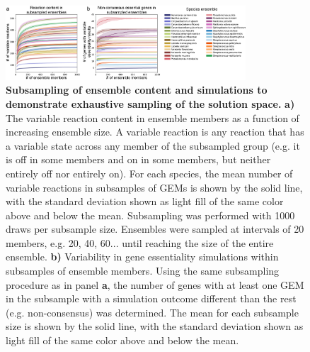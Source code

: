\documentclass[11pt,twocolumn,notitlepage,openany,twoside]{book}
\begin{document}
\begin{refsection}
\begin{figure}[tb]
\centering
\includegraphics[width=0.8\textwidth]{ch3_fig2}
\caption[ Subsampling of ensemble content and simulations to demonstrate exhaustive sampling of the solution space.]{\textbf{ Subsampling of ensemble content and simulations to demonstrate exhaustive sampling of the solution space.} \textbf{a)} The variable reaction content in ensemble members as a function of increasing ensemble size. A variable reaction is any reaction that has a variable state across any member of the subsampled group (e.g. it is off in some members and on in some members, but neither entirely off nor entirely on). For each species, the mean number of variable reactions in subsamples of GEMs is shown by the solid line, with the standard deviation shown as light fill of the same color above and below the mean. Subsampling was performed with 1000 draws per subsample size. Ensembles were sampled at intervals of 20 members, e.g. 20, 40, 60... until reaching the size of the entire ensemble. \textbf{b)} Variability in gene essentiality simulations within subsamples of ensemble members. Using the same subsampling procedure as in panel \textbf{a}, the number of genes with at least one GEM in the subsample with a simulation outcome different than the rest (e.g. non-consensus) was determined. The mean for each subsample size is shown by the solid line, with the standard deviation shown as light fill of the same color above and below the mean.}
\end{figure}


\end{refsection}
\end{document}
